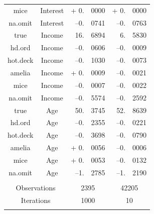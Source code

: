 \documentclass[12pt,econ]{sources/authesis}
\begin{document}
\begin{table}[!htbp]
\begin{tabular}{ccr@{}lr@{}l}
 mice & Interest & + 0.&0000 & + 0.&0000 \\ 
 na.omit & Interest & --0.&0741 & --0.&0763 \\
 true & Income & 16.&6894 & 6.&5830 \\
 hd.ord & Income & --0.&0606 & --0.&0009 \\ 
 hot.deck & Income & --0.&1030 & --0.&0073 \\
 amelia & Income & + 0.&0009 & --0.&0021 \\
 mice & Income & --0.&0007 & --0.&0022 \\
 na.omit & Income & --0.&5574 & --0.&2592 \\
 true & Age & 50.&3745 & 52.&8639 \\
 hd.ord & Age & --0.&2355 & --0.&0221 \\ 
 hot.deck & Age & --0.&3698 & --0.&0790 \\ 
 amelia & Age & + 0.&0056 & --0.&0006 \\
 mice & Age & + 0.&0053 & --0.&0132 \\
 na.omit & Age & --1.&2785 & --1.&2190 \\
 \hline \\[-1.8ex] 
\multicolumn{2}{c}{Observations} & \multicolumn{2}{c}{2395} & \multicolumn{2}{c}{42205} \\ 
\multicolumn{2}{c}{Iterations} & \multicolumn{2}{c}{1000} & \multicolumn{2}{c}{10} \\ 
\hline \\[-1.8ex] 
 \end{tabular} 
 \end{table}
\end{document}

